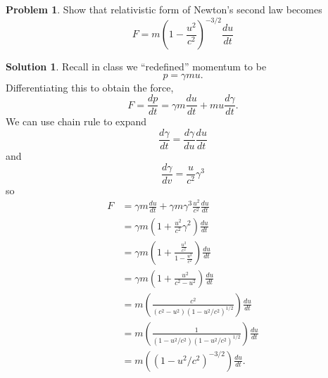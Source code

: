 \documentclass[10pt]{article}
\theoremstyle{definition}
\newtheorem{problem}{Problem}
\newtheorem{soln}{Solution}
\begin{document}
\begin{problem}
Show that relativistic form of Newton's second law becomes
$$F=m\left(1-\frac{u^2}{c^2}\right)^{-3/2}\frac{du}{dt}$$
\end{problem}
\begin{soln}
  Recall in class we ``redefined'' momentum to be
  $$p=\gamma mu.$$
  Differentiating this to obtain the force,
  $$F=\frac{dp}{dt}=\gamma m\frac{du}{dt}+mu\frac{d\gamma}{dt}.$$
  We can use chain rule to expand
  $$\frac{d\gamma}{dt}=\frac{d\gamma}{du}\frac{du}{dt}$$
  and
  $$\frac{d\gamma}{dv}=\frac{u}{c^2}\gamma^3$$
  so
  \begin{align*}
    F & =\gamma m\frac{du}{dt}+\gamma m\gamma^3\frac{u^2}{c^2}\frac{du}{dt} \\
      & =\gamma m(1+\frac{u^2}{c^2}\gamma^2)\frac{du}{dt}                   \\
      & =\gamma m(1+\frac{\frac{u^2}{c^2}}{1-\frac{u^2}{c^2}})\frac{du}{dt} \\
      & =\gamma m(1+\frac{u^2}{c^2-u^2})\frac{du}{dt}                       \\
      & =m(\frac{c^2}{(c^2-u^2)(1-u^2/c^2)^{1/2}})\frac{du}{dt}             \\
      & =m(\frac{1}{(1-u^2/c^2)(1-u^2/c^2)^{1/2}})\frac{du}{dt}             \\
      & =m((1-u^2/c^2)^{-3/2})\frac{du}{dt}.
  \end{align*}
\end{soln}
\newpage
\end{document}
